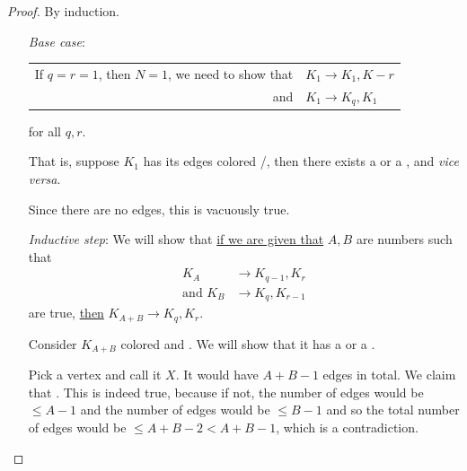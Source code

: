 \documentclass[12pt]{article}
\begin{document}
\begin{proof}
    By induction.
    \begin{enumerate}[align=left]
        \item[\textit{Base case}:] \begin{tabular}[t]{rl}
            If $q=r=1$, then $N=1$, we need to show that& $K_1\to K_1,K-r$\\
            and & $K_1\to K_q,K_1$
        \end{tabular} for all $q,r$. 
        
        That is, suppose $K_1$ has its edges colored /, then there exists a  or a , and \textit{vice versa}. 
        
        Since there are no edges, this is vacuously true.

        \item[\textit{Inductive step}:] \hypertarget{ramseyInductive}{We} will show 
        that \uline{if we are given that} $A,B$ are numbers such that \begin{align*}
            K_A&\to K_{q-1},K_r\\
            \text{and }K_B&\to K_q, K_{r-1}
        \end{align*}
        are true, \uline{then} $K_{A+B}\to K_q,K_r$.

        Consider $K_{A+B}$ colored  and . We will show that it has a  or a .
        
        Pick a vertex and call it $X$. It would have $A+B-1$ edges in total. We claim that . This is indeed true, because if not, the number of  edges would be $\leq A-1$ and the number of  edges would be $\leq B-1$ and so the total number of edges would be $\leq A+B-2<A+B-1$, which is a contradiction.


\end{enumerate}
\end{proof}
\end{document}
